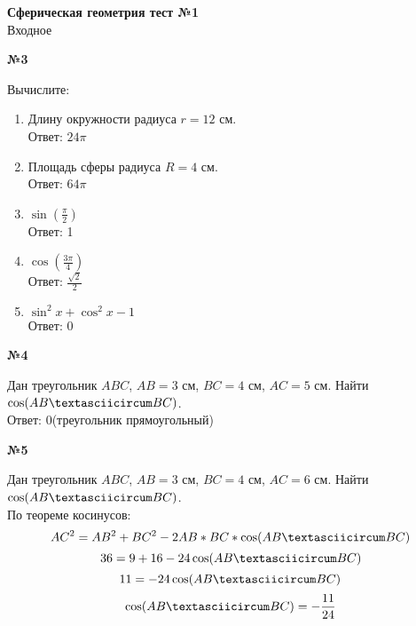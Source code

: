 


    \begin{center}
        \textbf{Сферическая геометрия тест №1}\\
        Входное 
    \end{center}

    \begin{center}
        \textbf{№3}
    \end{center}

    Вычислите:
    \begin{enumerate}
        \item Длину окружности радиуса $r = 12$ см.\\
        Ответ: $24\pi$

        \item Площадь сферы радиуса $R = 4$ см.\\
        Ответ: $64\pi$
        \
        \item $\sin\left(\frac{\pi}{2}\right)$\\
        Ответ: 1

        \item $\cos\left(\frac{3\pi}{4}\right)$\\
        Ответ: $\frac{\sqrt {2}}{2}$
        \item $\sin ^ 2 x + \cos ^ 2 x - 1$\\
        Ответ: 0
    \end{enumerate}

    \begin{center}
        \textbf{№4}
    \end{center}

    Дан треугольник $ABC$, $AB = 3$ см, $BC = 4$ см, $AC = 5$ см.
    Найти $\cos(AB \textasciicircum BC)$.\\
    Ответ: 0(треугольник прямоугольный)



    \begin{center}
        \textbf{№5}
    \end{center}

    Дан треугольник $ABC$, $AB = 3$ см, $BC = 4$ см, $AC = 6$ см.
    Найти $\cos(AB \textasciicircum BC)$.\\

    По теореме косинусов:
    \[  AC ^ 2 = AB ^ 2 + BC ^ 2 - 2 AB * BC * \cos(AB \textasciicircum BC) \]
    \[  36 = 9 + 16 - 24\cos(AB \textasciicircum BC) \]
    \[  11 = - 24\cos(AB \textasciicircum BC) \]
    \[ \cos(AB \textasciicircum BC)  = -\frac{11}{24}\]

